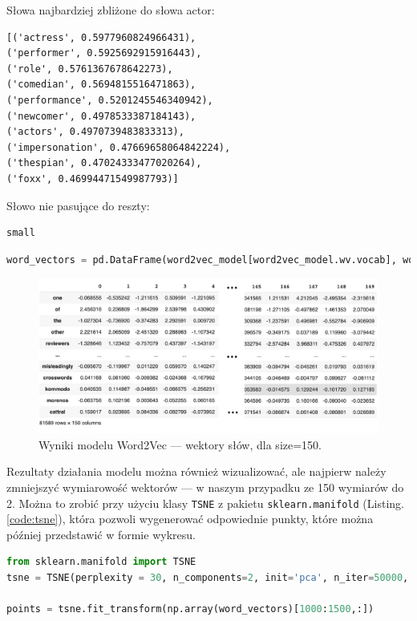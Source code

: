 \noindent Słowa najbardziej zbliżone do słowa actor:
\begin{Verbatim}
[('actress', 0.5977960824966431),
('performer', 0.5925692915916443),
('role', 0.5761367678642273),
('comedian', 0.5694815516471863),
('performance', 0.5201245546340942),
('newcomer', 0.4978533387184143),
('actors', 0.4970739483833313),
('impersonation', 0.47669658064842224),
('thespian', 0.47024333477020264),
('foxx', 0.46994471549987793)]
\end{Verbatim}

\noindent Słowo nie pasujące do reszty:
\begin{Verbatim}
small
\end{Verbatim}

\begin{lstlisting}[language=Python,frame=single, breaklines=true, caption=Generacja wektora słów --- model Word2Vec.,label=code:w2v-results]
word_vectors = pd.DataFrame(word2vec_model[word2vec_model.wv.vocab], word2vec_model.wv.vocab)
\end{lstlisting}

\begin{figure}[H]
	\centering
	\includegraphics[width=1\linewidth]{images/chapter3/w2v-dframe.pdf}
	\caption{Wyniki modelu Word2Vec --- wektory słów, dla size=150.}
	\label{fig:w2v-dframe}
\end{figure}

\noindent Rezultaty działania modelu można również wizualizować, ale najpierw należy zmniejszyć wymiarowość wektorów --- w naszym przypadku ze 150 wymiarów do 2. Można to zrobić przy użyciu klasy \verb|TSNE| z pakietu \verb|sklearn.manifold| (Listing. \ref{code:tsne}), która pozwoli wygenerować odpowiednie punkty, które można później przedstawić w formie wykresu.

\begin{lstlisting}[language=Python,frame=single, breaklines=true, caption=Zmniejszenie wymiarowości wektorów słów do punktów.,label=code:tsne]
from sklearn.manifold import TSNE
tsne = TSNE(perplexity = 30, n_components=2, init='pca', n_iter=50000, method='exact')tsne = TSNE(perplexity = 30, n_components=2, init='pca', n_iter=50000, method='exact')

points = tsne.fit_transform(np.array(word_vectors)[1000:1500,:])
\end{lstlisting}

